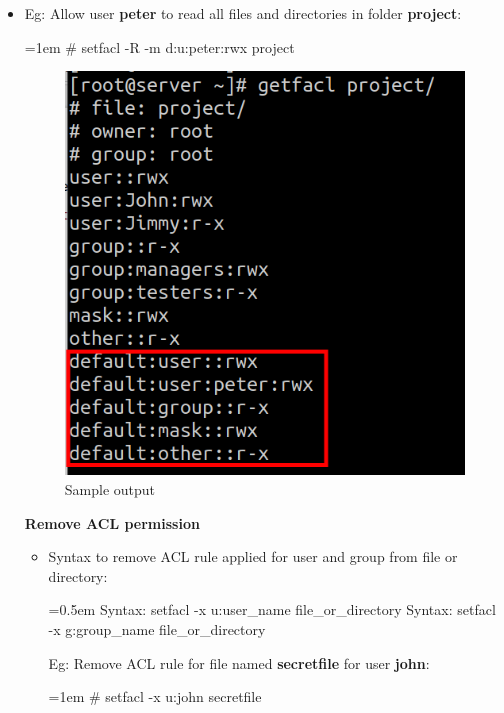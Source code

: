 \begin{flushleft}
\begin{itemize}
	\item Eg: Allow user \textbf{peter} to read all files and directories in folder \textbf{project}:
	\bigskip
	\begin{tcolorbox}[breakable,notitle,boxrule=-0pt,colback=black,colframe=black]
		\color{green}
		\font=1em
		\# setfacl -R -m d:u:peter:rwx  project
		\font=4pt
	\end{tcolorbox}

	\begin{figure}[h!]
		\centering
		\includegraphics[scale=0.4]{content/chapter6/images/getfacl2.png}
		\caption{Sample output}
		\label{fig:acl_example2}
	\end{figure}
	

\newpage

\textbf{Remove ACL permission}
\bigskip
\begin{itemize}
	\item Syntax to remove ACL rule applied for user and group from file or directory:
	\bigskip
	\begin{tcolorbox}[breakable,notitle,boxrule=-0pt,colback=pink,colframe=pink]
		\color{black}
		\font=0.5em
		Syntax: setfacl -x u:user\_name file\_or\_directory
		\newline
		Syntax: setfacl -x g:group\_name file\_or\_directory
		\font=4pt
	\end{tcolorbox}
	Eg: Remove ACL rule for file named \textbf{secretfile} for user \textbf{john}:
	\begin{tcolorbox}[breakable,notitle,boxrule=-0pt,colback=black,colframe=black]
		\color{green}
		\font=1em
		\# setfacl -x u:john secretfile
		\font=4pt
	\end{tcolorbox}


\end{itemize}
\end{itemize}
\end{flushleft}
